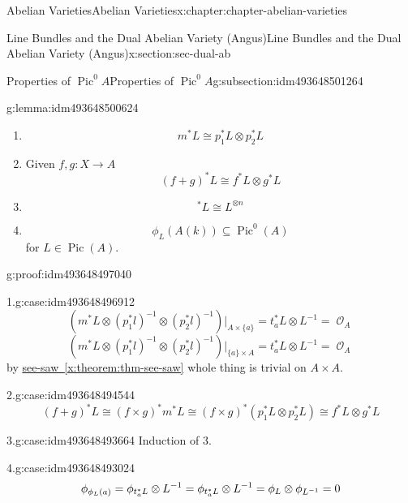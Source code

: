 \documentclass[oneside,10pt,]{book}
\newcommand{\qedhere}{\relax}
\numberwithin{equation}{section}
\newcommand{\sheaf}[1]{\operatorname{\mathcal{#1}}}
\DeclareMathOperator{\Pic}{Pic}
\begin{document}
\begin{chapterptx}{Abelian Varieties}{}{Abelian Varieties}{}{}{x:chapter:chapter-abelian-varieties}
\begin{sectionptx}{Line Bundles and the Dual Abelian Variety (Angus)}{}{Line Bundles and the Dual Abelian Variety (Angus)}{}{}{x:section:sec-dual-ab}
\begin{subsectionptx}{Properties of \(\Pic^0 A\)}{}{Properties of \(\Pic^0 A\)}{}{}{g:subsection:idm493648501264}
\begin{lemma}{}{}{g:lemma:idm493648500624}
\begin{enumerate}
\item{}%
\begin{equation*}
m^* L \cong p_1^* L\otimes p_2^* L
\end{equation*}
%
\item{}Given \(f,g \colon X \to A\)%
\begin{equation*}
(f+g)^* L \cong f^* L \otimes g^* L
\end{equation*}
%
\item{}%
\begin{equation*}
[n]^* L \cong L^{\otimes n}
\end{equation*}
%
\item{}%
\begin{equation*}
\phi_L(A(k)) \subseteq \Pic^0(A)
\end{equation*}
for \(L \in \Pic (A)\).%
\end{enumerate}
%
\end{lemma}
\begin{proofptx}{}{g:proof:idm493648497040}
\begin{case}{}{1.}{g:case:idm493648496912}
%
\begin{equation*}
(m^*L\otimes (p_1^*l)^{-1} \otimes (p_2^*l)^{-1})|_{A\times\{a\}} = t_a^*L \otimes L^{-1} = \sheaf O_A
\end{equation*}
%
\begin{equation*}
(m^*L\otimes (p_1^*l)^{-1} \otimes (p_2^*l)^{-1})|_{\{a\}\times A} = t_a^*L \otimes L^{-1} = \sheaf O_A
\end{equation*}
by \hyperref[x:theorem:thm-see-saw]{see-saw~\ref{x:theorem:thm-see-saw}} whole thing is trivial on \(A\times A\).%
\end{case}
\begin{case}{}{2.}{g:case:idm493648494544}
%
\begin{equation*}
(f+g)^*L\cong (f\times g)^* m^*L \cong (f\times g)^*(p_1^*L \otimes p_2^*L) \cong f^*L \otimes g^*L
\end{equation*}
%
\end{case}
\begin{case}{}{3.}{g:case:idm493648493664}
Induction of 3.%
\end{case}
\begin{case}{}{4.}{g:case:idm493648493024}
%
\begin{equation*}
\phi_{\phi_L(a)} = \phi_{t^*_a L}\otimes L^{-1} = \phi _{t_a^*L}\otimes L^{-1} = \phi_L \otimes \phi_{L^{-1}} = 0\qedhere
\end{equation*}
%
\end{case}

\end{proofptx}
\end{subsectionptx}
\end{sectionptx}
\end{chapterptx}
\end{document}

